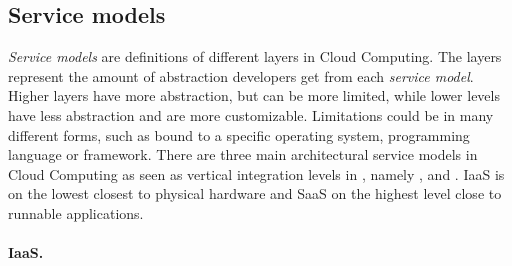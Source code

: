 \subsection{Service models}


\emph{Service models} are definitions of different layers in Cloud Computing.
The layers represent the amount of abstraction developers get from each \emph{service model}.
Higher layers have more abstraction, but can be more limited, while lower levels 
have less abstraction and are more customizable.
Limitations could be in many different forms, such as bound to a specific operating system,
programming language or framework.
There are three main architectural service models in Cloud Computing\cite{nist:mell11}
as seen as vertical integration levels in ,
namely ,  and .
IaaS is on the lowest closest to physical hardware and SaaS on the highest
level close to runnable applications.

\paragraph{IaaS.}

